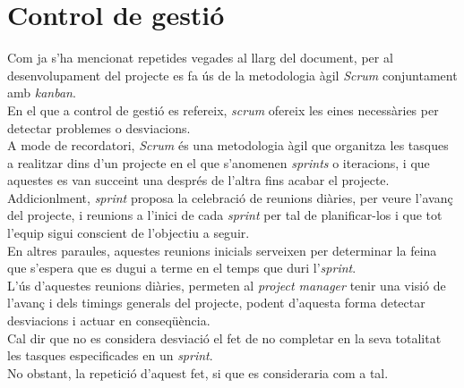 \section{Control de gestió}
Com ja s'ha mencionat repetides vegades al llarg del document, per al desenvolupament del projecte es fa ús de la metodologia àgil \textit{Scrum} conjuntament amb \textit{kanban}.\\
En el que a control de gestió es refereix, \textit{scrum} ofereix les eines necessàries per detectar problemes o desviacions.\\
\newline A mode de recordatori, \textit{Scrum} és una metodologia àgil que organitza les tasques a realitzar dins d'un projecte en el que s'anomenen \textit{sprints} o iteracions, i que aquestes es van succeint una després de l'altra fins acabar el projecte. Addicionlment, \textit{sprint} proposa la celebració de reunions diàries, per veure l'avanç del projecte, i reunions a l'inici de cada \textit{sprint} per tal de planificar-los i que tot l'equip sigui conscient de l'objectiu a seguir.\\
\newline En altres paraules, aquestes reunions inicials serveixen per determinar la feina que s'espera que es dugui a terme en el temps que duri l'\textit{sprint}.\\
\newline L'ús d'aquestes reunions diàries, permeten al \textit{project manager} tenir una visió de l'avanç i dels timings generals del projecte, podent d'aquesta forma detectar desviacions i actuar en conseqüència.\\
\newline Cal dir que no es considera desviació el fet de no completar en la seva totalitat les tasques especificades en un \textit{sprint}.\\
No obstant, la repetició d'aquest fet, si que es consideraria com a tal.\\

